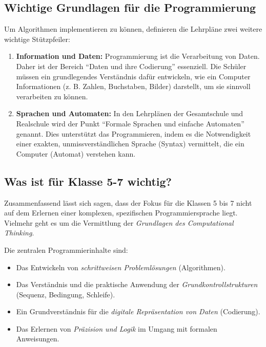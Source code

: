 \documentclass[a5paper,pagesize,10pt,bibtotoc,pointlessnumbers,
normalheadings,DIV=9,twoside=false]{scrbook}
\begin{document}
\subsection*{Wichtige Grundlagen für die Programmierung}

Um Algorithmen implementieren zu können, definieren die Lehrpläne zwei weitere wichtige Stützpfeiler:

\begin{enumerate}
    \item \textbf{Information und Daten:} Programmierung ist die Verarbeitung von Daten. Daher ist der Bereich ``Daten und ihre Codierung'' essenziell. Die Schüler müssen ein grundlegendes Verständnis dafür entwickeln, wie ein Computer Informationen (z. B. Zahlen, Buchstaben, Bilder) darstellt, um sie sinnvoll verarbeiten zu können.
    \item \textbf{Sprachen und Automaten:} In den Lehrplänen der Gesamtschule und Realschule wird der Punkt ``Formale Sprachen und einfache Automaten'' genannt. Dies unterstützt das Programmieren, indem es die Notwendigkeit einer exakten, unmissverständlichen Sprache (Syntax) vermittelt, die ein Computer (Automat) verstehen kann.

\end{enumerate}

\subsection*{Was ist für Klasse 5-7 wichtig?}

Zusammenfassend lässt sich sagen, dass der Fokus für die Klassen 5 bis 7 nicht auf dem Erlernen einer komplexen, spezifischen Programmiersprache liegt. Vielmehr geht es um die Vermittlung der \textit{Grundlagen des Computational Thinking}.

Die zentralen Programmierinhalte sind:

\begin{itemize}
    \item Das Entwickeln von \textit{schrittweisen Problemlösungen} (Algorithmen).
    \item Das Verständnis und die praktische Anwendung der \textit{Grundkontrollstrukturen} (Sequenz, Bedingung, Schleife).
    \item Ein Grundverständnis für die \textit{digitale Repräsentation von Daten} (Codierung).
    \item Das Erlernen von \textit{Präzision und Logik} im Umgang mit formalen Anweisungen.
\end{itemize}
\end{document}
